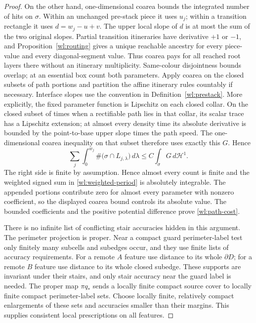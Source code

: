 \documentclass[11pt]{article}
\numberwithin{equation}{section}
\theoremstyle{definition}
\theoremstyle{remark}
\begin{document}
\begin{proof}
On the other hand, one-dimensional coarea bounds the integrated
number of hits on $\sigma$.  Within an unchanged pre-stack piece it
uses $u_j$; within a transition rectangle it uses
$d=w_j-u+v$.  The upper local slope of $d$ is at most the sum of the
two original slopes.  Partial transition itineraries have derivative
$+1$ or $-1$, and Proposition~\ref{wl:routing} gives a unique reachable
ancestry for every piece-value and every diagonal-segment value.
Thus coarea pays for all reached root layers there without an
itinerary multiplicity.  Same-colour disjointness bounds overlap;
at an essential box count both parameters.  Apply coarea on the
closed subsets of path portions and partition the affine itinerary
rules countably if necessary.  Interface slopes use the convention in
Definition~\ref{wl:prestack}.  More explicitly, the fixed parameter
function is Lipschitz on each closed collar.  On the closed subset
of times when a rectifiable path lies in that collar, its scalar
trace has a Lipschitz extension; at almost every density time its
absolute derivative is bounded by the point-to-base upper slope
times the path speed.  The one-dimensional coarea inequality on
that subset therefore uses exactly this $G$.  Hence
\[
 \sum_j\int_0^{w_j}
       \#\bigl(\sigma\cap L_{j,\lambda}\bigr)\,d\lambda
       \leq C\int_\sigma G\,d\mathcal H^1.
\]
The right side is finite by assumption.  Hence almost every count
is finite and the weighted signed sum in \eqref{wl:weighted-period} is absolutely
integrable.  The appended portions contribute zero for almost every
parameter with nonzero coefficient, so the displayed coarea bound
controls its absolute value.  The bounded coefficients and the
positive potential difference prove \eqref{wl:path-cost}.

There is no infinite list of conflicting stair accuracies hidden in
this argument.  The perimeter projection is proper.  Near a compact
guard perimeter-label test only finitely many subcells and subedges
occur, and they use finite lists of accuracy requirements.  For a remote $A$
feature use distance to its whole $\partial D$; for a remote $B$
feature use distance to its whole closed subedge.  These supports are
invariant under their stairs, and only stair accuracy near the guard
label is needed.  The proper map $\pi q_*$ sends a locally finite
compact source cover to locally finite compact perimeter-label sets.
Choose locally finite, relatively compact enlargements of these sets
and accuracies smaller than their margins.  This supplies consistent
local prescriptions on all features.
\end{proof}
\end{document}
